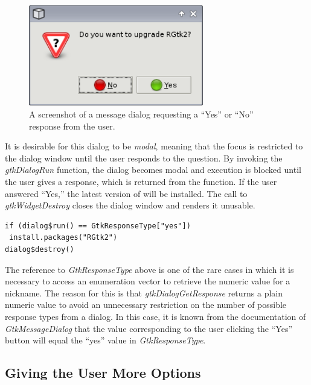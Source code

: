 \documentclass[article]{jss}
\begin{document}
\begin{figure}
\begin{center}
\includegraphics[width=3in]{upgrade-dialog.png}
\caption{\label{fig:upgrade-dialog}A screenshot of a message dialog
requesting a 
``Yes'' or ``No'' response from the user.}
\end{center}
\end{figure}

It is desirable for this dialog to be \emph{modal}, meaning that the
focus
is restricted to the dialog window until the user responds to the
question. By
invoking the \emph{gtkDialogRun} function, the dialog becomes modal
and execution
is blocked until the user gives a response, which is returned from the
function.
If the user answered ``Yes,'' the latest version of  will
be 
installed. The call to \emph{gtkWidgetDestroy} closes the dialog
window and 
renders it unusable.
\begin{verbatim}
if (dialog$run() == GtkResponseType["yes"])
 install.packages("RGtk2")
dialog$destroy()
\end{verbatim}
The reference to \emph{GtkResponseType} above is one of the rare cases
in which
it is necessary to access an enumeration vector to retrieve the
numeric value
for a nickname. The reason for this is that
\emph{gtkDialogGetResponse} returns
a plain numeric value to avoid an unnecessary restriction on the
number of 
possible response types from a dialog. In this case, it is known from
the documentation of \emph{GtkMessageDialog} that the value
corresponding to
the user clicking the ``Yes'' button will equal the ``yes'' value in
\emph{GtkResponseType}.

\subsection{Giving the User More Options}
\end{document}
